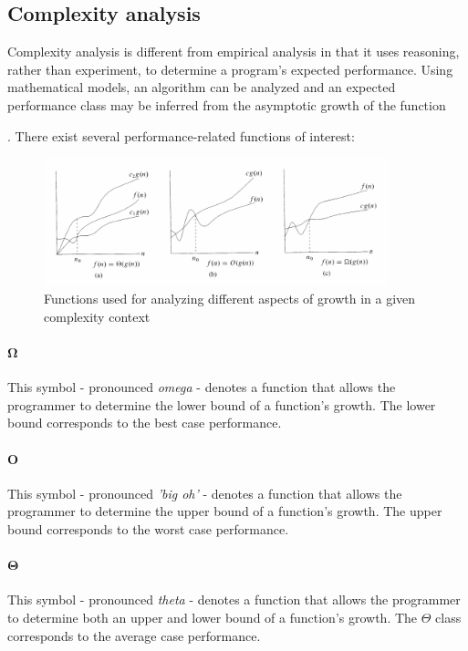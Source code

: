 \documentclass{article}
\begin{document}
\subsection{Complexity analysis}
Complexity analysis is different from empirical analysis in that it uses reasoning, rather than experiment, to determine
a program's expected performance. Using mathematical models, an algorithm can be analyzed and an expected performance class
may be inferred from the asymptotic growth of the function{\cite[p.43-49]{introduction-to-algorithms}. There exist several
performance-related functions of interest:

\begin{samepage}
  \begin{figure}[H]
    \centering
    \includegraphics[width=10cm]{theta_o_omega}
    \caption{Functions used for analyzing different aspects of growth in a given complexity context
     \cite[p.45]{introduction-to-algorithms}}
  \end{figure}
  
  \paragraph{\(\boldsymbol \Omega\)}
  This symbol - pronounced {\em omega} - denotes a function that allows the programmer to determine the lower bound of a
  function's growth. The lower bound corresponds to the best case performance.
  
  \paragraph{\(\boldsymbol O\)}
  This symbol - pronounced {\em 'big oh'} - denotes a function that allows the programmer to determine the upper bound of a
  function's growth. The upper bound corresponds to the worst case performance.
  
  \paragraph{\(\boldsymbol \Theta\)}
  This symbol - pronounced {\em theta} - denotes a function that allows the programmer to determine both an upper and lower
  bound of a function's growth. The \(\Theta\) class corresponds to the average case performance.
\end{samepage}

}
\end{document}
